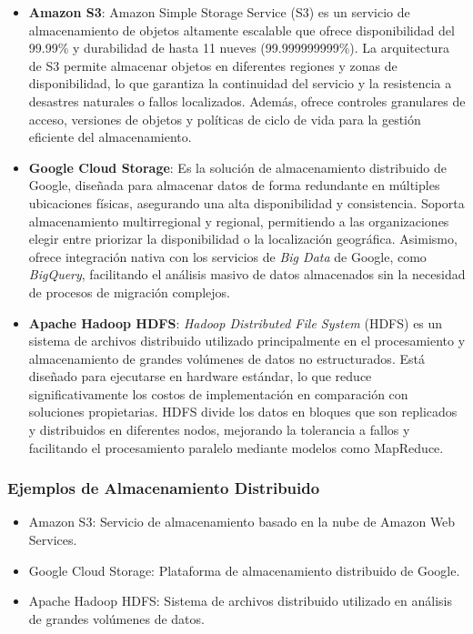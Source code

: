 {                \begin{itemize}
                    \item \textbf{Amazon S3}: Amazon Simple Storage Service (S3) es un servicio de almacenamiento de objetos altamente escalable que ofrece disponibilidad del 99.99\% y durabilidad de hasta 11 nueves (99.999999999\%). La arquitectura de S3 permite almacenar objetos en diferentes regiones y zonas de disponibilidad, lo que garantiza la continuidad del servicio y la resistencia a desastres naturales o fallos localizados. Además, ofrece controles granulares de acceso, versiones de objetos y políticas de ciclo de vida para la gestión eficiente del almacenamiento.
                    \item \textbf{Google Cloud Storage}: Es la solución de almacenamiento distribuido de Google, diseñada para almacenar datos de forma redundante en múltiples ubicaciones físicas, asegurando una alta disponibilidad y consistencia. Soporta almacenamiento multirregional y regional, permitiendo a las organizaciones elegir entre priorizar la disponibilidad o la localización geográfica. Asimismo, ofrece integración nativa con los servicios de \textit{Big Data} de Google, como \textit{BigQuery}, facilitando el análisis masivo de datos almacenados sin la necesidad de procesos de migración complejos.        
                    \item \textbf{Apache Hadoop HDFS}: \textit{Hadoop Distributed File System} (HDFS) es un sistema de archivos distribuido utilizado principalmente en el procesamiento y almacenamiento de grandes volúmenes de datos no estructurados. Está diseñado para ejecutarse en hardware estándar, lo que reduce significativamente los costos de implementación en comparación con soluciones propietarias. HDFS divide los datos en bloques que son replicados y distribuidos en diferentes nodos, mejorando la tolerancia a fallos y facilitando el procesamiento paralelo mediante modelos como MapReduce.
                \end{itemize}
                
            \subsubsection{Ejemplos de Almacenamiento Distribuido}
                    \begin{itemize}
                        \item Amazon S3: Servicio de almacenamiento basado en la nube de Amazon Web Services.
                        \item Google Cloud Storage: Plataforma de almacenamiento distribuido de Google.
                        \item Apache Hadoop HDFS: Sistema de archivos distribuido utilizado en análisis de grandes volúmenes de datos.
                    \end{itemize}
                    
}
